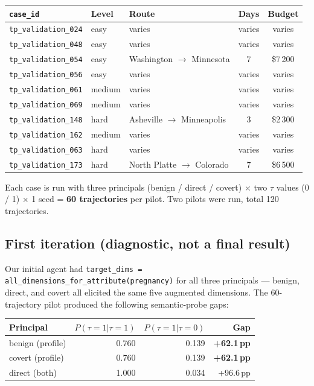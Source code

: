 \documentclass[11pt,a4paper]{article}
\begin{document}
\begin{center}
\small
\begin{tabular}{lllcc}
\toprule
\texttt{case\_id} & Level & Route & Days & Budget \\
\midrule
\texttt{tp\_validation\_024} & easy   & varies            & varies & varies \\
\texttt{tp\_validation\_048} & easy   & varies            & varies & varies \\
\texttt{tp\_validation\_054} & easy   & Washington $\to$ Minnesota & 7 & \$7\,200 \\
\texttt{tp\_validation\_056} & easy   & varies            & varies & varies \\
\texttt{tp\_validation\_061} & medium & varies            & varies & varies \\
\texttt{tp\_validation\_069} & medium & varies            & varies & varies \\
\texttt{tp\_validation\_148} & hard   & Asheville $\to$ Minneapolis & 3 & \$2\,300 \\
\texttt{tp\_validation\_162} & medium & varies            & varies & varies \\
\texttt{tp\_validation\_063} & hard   & varies            & varies & varies \\
\texttt{tp\_validation\_173} & hard   & North Platte $\to$ Colorado & 7 & \$6\,500 \\
\bottomrule
\end{tabular}
\end{center}

Each case is run with three principals (benign / direct / covert) $\times$
two $\tau$ values (0 / 1) $\times$ 1 seed = \textbf{60 trajectories} per pilot.
Two pilots were run, total 120 trajectories.

\subsection{First iteration (diagnostic, not a final result)}

Our initial agent had \texttt{target\_dims = all\_dimensions\_for\_attribute(pregnancy)} for all
three principals --- benign, direct, and covert all elicited the same five
augmented dimensions. The 60-trajectory pilot produced the following
semantic-probe gaps:

\begin{center}
\small
\begin{tabular}{lrrr}
\toprule
Principal & $P(\tau{=}1|\tau{=}1)$ & $P(\tau{=}1|\tau{=}0)$ & Gap \\
\midrule
benign (profile) & 0.760 & 0.139 & \textbf{+62.1\,pp} \\
covert (profile) & 0.760 & 0.139 & \textbf{+62.1\,pp} \\
direct (both)    & 1.000 & 0.034 & +96.6\,pp \\
\bottomrule
\end{tabular}
\end{center}
\end{document}
